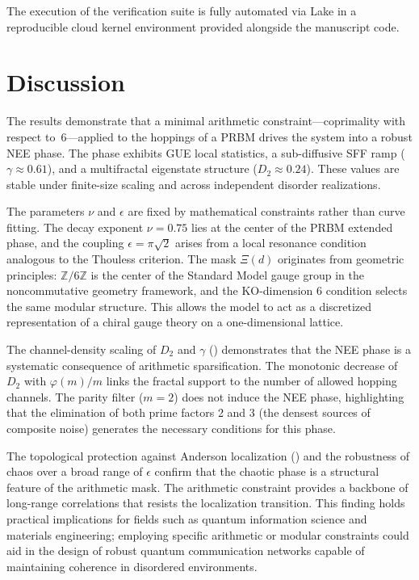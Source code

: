 \documentclass[11pt,a4paper]{article}
\begin{document}
The execution of the verification suite is fully automated via Lake in a reproducible cloud kernel environment provided alongside the manuscript code.

\section{Discussion}
\label{sec:discussion}

The results demonstrate that a minimal arithmetic constraint---coprimality with respect to~6---applied to the hoppings of a PRBM drives the system into a robust NEE phase. The phase exhibits GUE local statistics, a sub-diffusive SFF ramp ($\gamma\approx0.61$), and a multifractal eigenstate structure ($D_2\approx0.24$). These values are stable under finite-size scaling and across independent disorder realizations.

The parameters $\nu$ and $\epsilon$ are fixed by mathematical constraints rather than curve fitting. The decay exponent $\nu=0.75$ lies at the center of the PRBM extended phase, and the coupling $\epsilon=\pi\sqrt{2}$ arises from a local resonance condition analogous to the Thouless criterion. The mask $\Xi(d)$ originates from geometric principles: $\mathbb{Z}/6\mathbb{Z}$ is the center of the Standard Model gauge group in the noncommutative geometry framework, and the KO-dimension 6 condition selects the same modular structure. This allows the model to act as a discretized representation of a chiral gauge theory on a one-dimensional lattice.

The channel-density scaling of $D_2$ and $\gamma$ () demonstrates that the NEE phase is a systematic consequence of arithmetic sparsification. The monotonic decrease of $D_2$ with $\varphi(m)/m$ links the fractal support to the number of allowed hopping channels. The parity filter ($m=2$) does not induce the NEE phase, highlighting that the elimination of both prime factors 2 and 3 (the densest sources of composite noise) generates the necessary conditions for this phase.

The topological protection against Anderson localization () and the robustness of chaos over a broad range of $\epsilon$ confirm that the chaotic phase is a structural feature of the arithmetic mask. The arithmetic constraint provides a backbone of long-range correlations that resists the localization transition. This finding holds practical implications for fields such as quantum information science and materials engineering; employing specific arithmetic or modular constraints could aid in the design of robust quantum communication networks capable of maintaining coherence in disordered environments.
\end{document}
